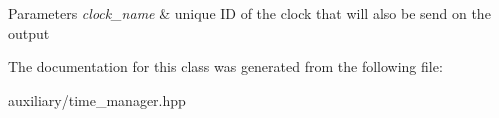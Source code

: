 \begin{DoxyParams}{Parameters}
{\em clock\-\_\-name} & unique I\-D of the clock that will also be send on the output \\
\hline
\end{DoxyParams}


The documentation for this class was generated from the following file\-:\begin{DoxyCompactItemize}
\item 
auxiliary/time\-\_\-manager.\-hpp\end{DoxyCompactItemize}

